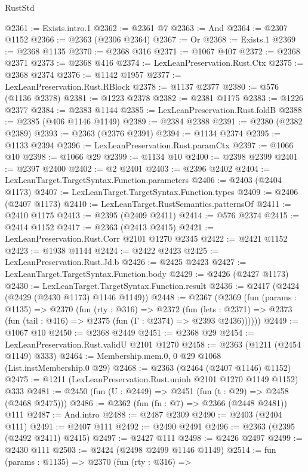 \begin{lexlean}{RustStd}
\begin{coremodule}
@2361 := Exists.intro.{1}
@2362 := @2361 @7
@2363 := And
@2364 := @2307 @1152
@2366 := @2363 (@2306 @2364)
@2367 := Or
@2368 := Exists.{1}
@2369 := @2368 @1135
@2370 := @2368 @316
@2371 := @1067 @407
@2372 := @2368 @2371
@2373 := @2368 @416
@2374 := LexLeanPreservation.Rust.Ctx
@2375 := @2368 @2374
@2376 := @1142 @1957
@2377 := LexLeanPreservation.Rust.RBlock
@2378 := @1137 @2377
@2380 := @576 (@1136 @2378)
@2381 := @1223 @2378
@2382 := @2381 @1175
@2383 := @1226 @2377
@2384 := @2383 @1144
@2385 := LexLeanPreservation.Rust.foldB
@2388 := @2385 (@406 @1146 @1149)
@2389 := @2384 @2388
@2391 := @2380 (@2382 @2389)
@2393 := @2363 (@2376 @2391)
@2394 := @1134 @2374
@2395 := @1133 @2394
@2396 := LexLeanPreservation.Rust.paramCtx
@2397 := @1066 @10
@2398 := @1066 @29
@2399 := @1134 @10
@2400 := @2398 @2399
@2401 := @2397 @2400
@2402 := @2 @2401
@2403 := @2396 @2402
@2404 := LexLeanTarget.TargetSyntax.Function.parameters
@2406 := @2403 (@2404 @1173)
@2407 := LexLeanTarget.TargetSyntax.Function.types
@2409 := @2406 (@2407 @1173)
@2410 := LexLeanTarget.RustSemantics.patternsOf
@2411 := @2410 @1175
@2413 := @2395 (@2409 @2411)
@2414 := @576 @2374
@2415 := @2414 @1152
@2417 := @2363 (@2413 @2415)
@2421 := LexLeanPreservation.Rust.Corr @2101 @1270 @2345
@2422 := @2421 @1152
@2423 := @1938 @1144
@2424 := @2422 @2423
@2425 := LexLeanPreservation.Rust.Jd.b
@2426 := @2425 @2423
@2427 := LexLeanTarget.TargetSyntax.Function.body
@2429 := @2426 (@2427 @1173)
@2430 := LexLeanTarget.TargetSyntax.Function.result
@2436 := @2417 (@2424 (@2429 (@2430 @1173) @1146 @1149))
@2448 := @2367
    (@2369
      (fun (params : @1135) =>
      @2370
        (fun (rty : @316) =>
        @2372
          (fun (lets : @2371) =>
          @2373 (fun (tail : @416) => @2375 (fun (Γ : @2374) => @2393 @2436))))))
@2449 := @1067 @10
@2450 := @2368 @2449
@2451 := @2368 @29
@2454 := LexLeanPreservation.Rust.validU @2101 @1270
@2458 := @2363 (@1211 (@2454 @1149) @333)
@2464 := Membership.mem.{0, 0} @29 @1068 (List.instMembership.{0} @29)
@2468 := @2363 (@2464 (@2407 @1146) @1152)
@2475 := @1211 (LexLeanPreservation.Rust.uninh @2101 @1270 @1149 @1152) @333
@2481 := @2450 (fun (U : @2449) => @2451 (fun (t : @29) => @2458 (@2468 @2475)))
@2486 := @2362 (fun (fn : @7) => @2366 (@2448 @2481)) @111
@2487 := And.intro
@2488 := @2487 @2309
@2490 := @2403 (@2404 @111)
@2491 := @2407 @111
@2492 := @2490 @2491
@2496 := @2363 (@2395 (@2492 @2411) @2415)
@2497 := @2427 @111
@2498 := @2426 @2497
@2499 := @2430 @111
@2503 := @2424 (@2498 @2499 @1146 @1149)
@2514 := fun (params : @1135) =>
  @2370
    (fun (rty : @316) =>

\end{coremodule}
\end{lexlean}
